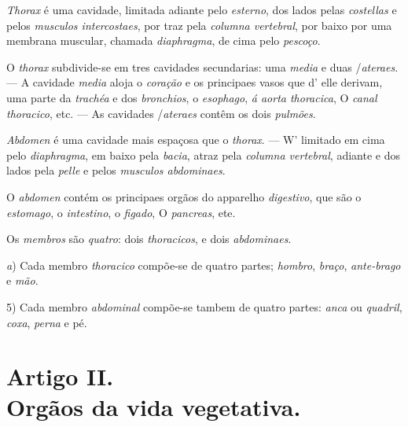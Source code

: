 
 
\emph{Thorax} é uma cavidade, limitada adiante pelo \emph{esterno}, dos lados pelas \emph{costellas} e pelos \emph{musculos intercostaes}, por traz pela \emph{columna vertebral}, por baixo por uma membrana muscular, chamada \emph{diaphragma}, de cima pelo \emph{pescoço}.

O \emph{thorax} subdivide-se em tres cavidades secundarias: uma \emph{media} e duas /\emph{ateraes}. --- A cavidade \emph{media} aloja o \emph{coração} e os principaes vasos que d' elle derivam, uma parte da \emph{trachéa} e dos \emph{bronchios}, o \emph{esophago}, \emph{á aorta thoracica}, O \emph{canal thoracico}, etc. --- As cavidades /\emph{ateraes} contêm os dois \emph{pulmões}.


\emph{Abdomen} é uma cavidade mais espaçosa que o \emph{thorax}. --- W' limitado em cima pelo \emph{diaphragma}, em baixo pela \emph{bacia}, atraz pela \emph{columna vertebral}, adiante e dos lados pela \emph{pelle} e pelos \emph{musculos abdominaes}.

O \emph{abdomen} contém os principaes orgãos do apparelho \emph{digestivo}, que são o \emph{estomago}, o \emph{intestino}, o \emph{figado}, O \emph{pancreas}, ete.


Os \emph{membros} são \emph{quatro}: dois \emph{thoracicos}, e dois \emph{abdominaes}.

\emph{a}) Cada membro \emph{thoracico} compõe-se de quatro partes; \emph{hombro}, \emph{braço}, \emph{ante-brago} e \emph{mão}.

5) Cada membro \emph{abdominal} compõe-se tambem de quatro partes: \emph{anca} ou \emph{quadril}, \emph{coxa}, \emph{perna} e pé.


\section*{Artigo II.\\ Orgãos da vida vegetativa.}


